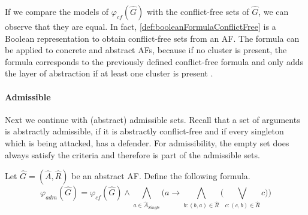 If we compare the models of $\varphi_{cf}(\hat{G})$ with the conflict-free sets of $\hat{G}$, we can observe that they are equal. In fact, \cref{def:booleanFormulaConflictFree} is a Boolean representation to obtain conflict-free sets from an AF. The formula can be applied to concrete and abstract AFs, because if no cluster is present, the formula corresponds to the previously defined conflict-free formula and only adds the layer of abstraction if at least one cluster is present \cite{inproceedingsBesnardDoutreBooleanFormulaSemantics}.


\paragraph{Admissible} Next we continue with (abstract) admissible sets. Recall that a set of arguments is abstractly admissible, if it is abstractly conflict-free and if every singleton which is being attacked, has a defender. For admissibility, the empty set does always satisfy the criteria and therefore is part of the admissible sets.

\begin{definition}
    Let $\hat{G}=(\hat{A}, \hat{R})$ be an abstract AF. Define the following formula.
        \[ \varphi_{adm}(\hat{G})=
        \varphi_{cf}(\hat{G}) \land  \bigwedge_{a \in \hat{A}_{\mathit{Single}}} \big( a \rightarrow \bigwedge_{b:(b,a) \in \hat{R}} \big( \bigvee_{c:(c,b) \in \hat{R}} c\big) \big)
        \]
    \label{def:booleanFormulaAdmissible}
\end{definition}


